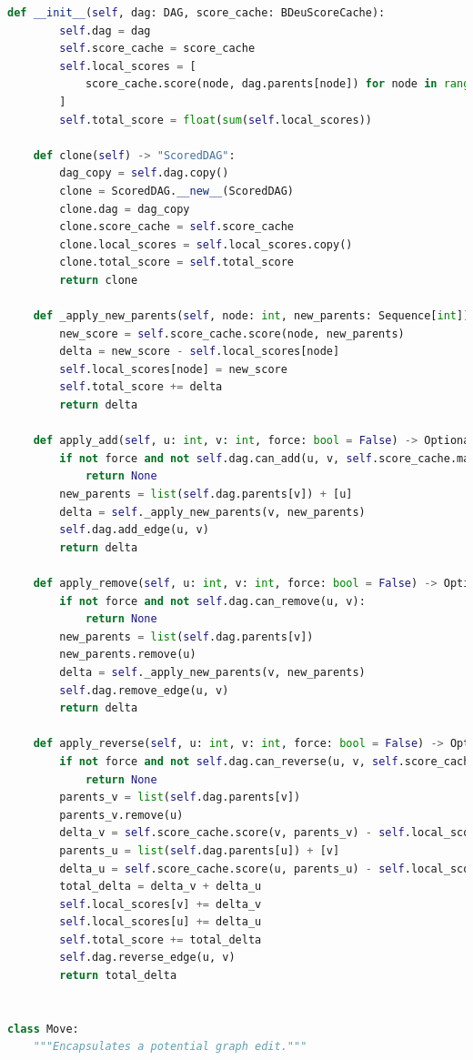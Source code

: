 \documentclass[twoside,11pt]{article}
\begin{document}
\begin{algorithm}
\begin{lstlisting}[language=Python]
    def __init__(self, dag: DAG, score_cache: BDeuScoreCache):
        self.dag = dag
        self.score_cache = score_cache
        self.local_scores = [
            score_cache.score(node, dag.parents[node]) for node in range(dag.num_nodes)
        ]
        self.total_score = float(sum(self.local_scores))

    def clone(self) -> "ScoredDAG":
        dag_copy = self.dag.copy()
        clone = ScoredDAG.__new__(ScoredDAG)
        clone.dag = dag_copy
        clone.score_cache = self.score_cache
        clone.local_scores = self.local_scores.copy()
        clone.total_score = self.total_score
        return clone

    def _apply_new_parents(self, node: int, new_parents: Sequence[int]) -> float:
        new_score = self.score_cache.score(node, new_parents)
        delta = new_score - self.local_scores[node]
        self.local_scores[node] = new_score
        self.total_score += delta
        return delta

    def apply_add(self, u: int, v: int, force: bool = False) -> Optional[float]:
        if not force and not self.dag.can_add(u, v, self.score_cache.max_parents):
            return None
        new_parents = list(self.dag.parents[v]) + [u]
        delta = self._apply_new_parents(v, new_parents)
        self.dag.add_edge(u, v)
        return delta

    def apply_remove(self, u: int, v: int, force: bool = False) -> Optional[float]:
        if not force and not self.dag.can_remove(u, v):
            return None
        new_parents = list(self.dag.parents[v])
        new_parents.remove(u)
        delta = self._apply_new_parents(v, new_parents)
        self.dag.remove_edge(u, v)
        return delta

    def apply_reverse(self, u: int, v: int, force: bool = False) -> Optional[float]:
        if not force and not self.dag.can_reverse(u, v, self.score_cache.max_parents):
            return None
        parents_v = list(self.dag.parents[v])
        parents_v.remove(u)
        delta_v = self.score_cache.score(v, parents_v) - self.local_scores[v]
        parents_u = list(self.dag.parents[u]) + [v]
        delta_u = self.score_cache.score(u, parents_u) - self.local_scores[u]
        total_delta = delta_v + delta_u
        self.local_scores[v] += delta_v
        self.local_scores[u] += delta_u
        self.total_score += total_delta
        self.dag.reverse_edge(u, v)
        return total_delta


class Move:
    """Encapsulates a potential graph edit."""


\end{lstlisting}
\end{algorithm}
\end{document}
